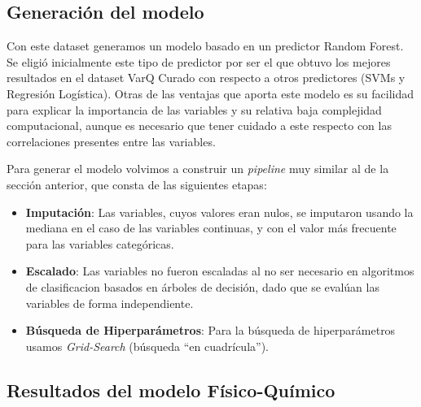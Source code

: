 



\subsection{Generación del modelo}

Con este dataset generamos un modelo basado en un predictor Random Forest. 
Se eligió inicialmente este tipo de predictor por ser el que obtuvo los mejores resultados en el dataset VarQ Curado con respecto a otros predictores (SVMs y Regresión Logística). Otras de las ventajas que aporta este modelo es su facilidad para explicar la importancia de las variables y su relativa baja complejidad computacional, aunque es necesario que tener cuidado a este respecto con las correlaciones presentes entre las variables.

Para generar el modelo volvimos a construir un \textit{pipeline} muy similar al de la sección anterior, que consta de las siguientes etapas:

\begin{itemize}
 
\item \textbf{Imputación}: Las variables, cuyos valores eran nulos, se imputaron usando la mediana en el caso de las variables continuas, y con el valor más frecuente para las variables categóricas. 
\item \textbf{Escalado}: Las variables no fueron escaladas al no ser necesario en algoritmos de clasificacion basados en árboles de decisión, dado que se evalúan las variables de forma independiente. 
\item \textbf{Búsqueda de Hiperparámetros}: Para la búsqueda de hiperparámetros usamos \textit{Grid-Search} (búsqueda ``en cuadrícula'').
\end{itemize}


\subsection{Resultados del modelo Físico-Químico}

